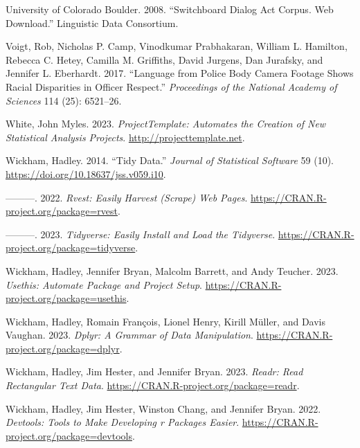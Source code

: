 \documentclass[
  letterpaper,
  DIV=11,
  numbers=noendperiod]{scrreport}
\newlength{\cslhangindent}
\newlength{\cslentryspacingunit} %
\newenvironment{CSLReferences}[2] %
 {%
  \setlength{\parindent}{0pt}
  \ifodd #1
  \let\oldpar\par
  \def\par{\hangindent=\cslhangindent\oldpar}
  \fi
  \setlength{\parskip}{#2\cslentryspacingunit}
 }%
 {}
\theoremstyle{definition}
\theoremstyle{remark}
\begin{document}
\begin{CSLReferences}{1}{0}
\leavevmode{}%
University of Colorado Boulder. 2008. {``Switchboard Dialog Act Corpus.
Web Download.''} Linguistic Data Consortium.

\leavevmode{}%
Voigt, Rob, Nicholas P. Camp, Vinodkumar Prabhakaran, William L.
Hamilton, Rebecca C. Hetey, Camilla M. Griffiths, David Jurgens, Dan
Jurafsky, and Jennifer L. Eberhardt. 2017. {``Language from Police Body
Camera Footage Shows Racial Disparities in Officer Respect.''}
\emph{Proceedings of the National Academy of Sciences} 114 (25):
6521--26.

\leavevmode{}%
White, John Myles. 2023. \emph{ProjectTemplate: Automates the Creation
of New Statistical Analysis Projects}. \url{http://projecttemplate.net}.

\leavevmode{}%
Wickham, Hadley. 2014. {``Tidy Data.''} \emph{Journal of Statistical
Software} 59 (10). \url{https://doi.org/10.18637/jss.v059.i10}.

\leavevmode{}%
---------. 2022. \emph{Rvest: Easily Harvest (Scrape) Web Pages}.
\url{https://CRAN.R-project.org/package=rvest}.

\leavevmode{}%
---------. 2023. \emph{Tidyverse: Easily Install and Load the
Tidyverse}. \url{https://CRAN.R-project.org/package=tidyverse}.

\leavevmode{}%
Wickham, Hadley, Jennifer Bryan, Malcolm Barrett, and Andy Teucher.
2023. \emph{Usethis: Automate Package and Project Setup}.
\url{https://CRAN.R-project.org/package=usethis}.

\leavevmode{}%
Wickham, Hadley, Romain François, Lionel Henry, Kirill Müller, and Davis
Vaughan. 2023. \emph{Dplyr: A Grammar of Data Manipulation}.
\url{https://CRAN.R-project.org/package=dplyr}.

\leavevmode{}%
Wickham, Hadley, Jim Hester, and Jennifer Bryan. 2023. \emph{Readr: Read
Rectangular Text Data}. \url{https://CRAN.R-project.org/package=readr}.

\leavevmode{}%
Wickham, Hadley, Jim Hester, Winston Chang, and Jennifer Bryan. 2022.
\emph{Devtools: Tools to Make Developing r Packages Easier}.
\url{https://CRAN.R-project.org/package=devtools}.


\end{CSLReferences}
\end{document}
